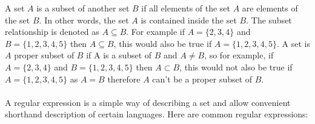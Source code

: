   A set $A$ is a subset of another set $B$ if all elements of the set $A$ are elements of the set $B$. In other words, the set $A$ is contained inside the set $B$. The subset relationship is denoted as $A\subseteq B$. For example if $A = \{2,3,4\}$ and $B = \{1,2,3,4,5\}$ then $A\subseteq B$, this would also be true if $A = \{1,2,3,4,5\}$. A set is $A$ proper subset of $B$ if A is a subset of $B$ and $A \neq B$, so for example,  if $A = \{2,3,4\}$ and $B = \{1,2,3,4,5\}$ then $A\subset B$, this would not also be true if $A = \{1,2,3,4,5\}$ as $A=B$ therefore $A$ can't be a proper subset of $B$.\\ \\
  \noindent
  A regular expression is a simple way of describing a set and allow convenient shorthand description of certain languages. Here are common regular expressions:
